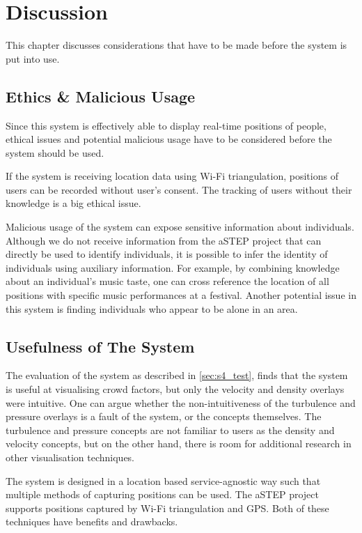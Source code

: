 \chapter{Discussion}

This chapter discusses considerations that have to be made before the system is put into use.

\section{Ethics \& Malicious Usage}
Since this system is effectively able to display real-time positions of people, ethical issues and potential malicious usage have to be considered before the system should be used. 

If the system is receiving location data using Wi-Fi triangulation, positions of users can be recorded without user's consent. The tracking of users without their knowledge is a big ethical issue.

Malicious usage of the system can expose sensitive information about individuals. Although we do not receive information from the aSTEP project that can directly be used to identify individuals, it is possible to infer the identity of individuals using auxiliary information. For example, by combining knowledge about an individual's music taste, one can cross reference the location of all positions with specific music performances at a festival. Another potential issue in this system is finding individuals who appear to be alone in an area. 

\section{Usefulness of The System}
The evaluation of the system as described in \cref{sec:s4_test}, finds that the system is useful at visualising crowd factors, but only the velocity and density overlays were intuitive. One can argue whether the non-intuitiveness of the turbulence and pressure overlays is a fault of the system, or the concepts themselves. The turbulence and pressure concepts are not familiar to users as the density and velocity concepts, but on the other hand, there is room for additional research in other visualisation techniques.


The system is designed in a location based service-agnostic way such that multiple methods of capturing positions can be used. The aSTEP project supports positions captured by Wi-Fi triangulation and GPS. Both of these techniques have benefits and drawbacks.

